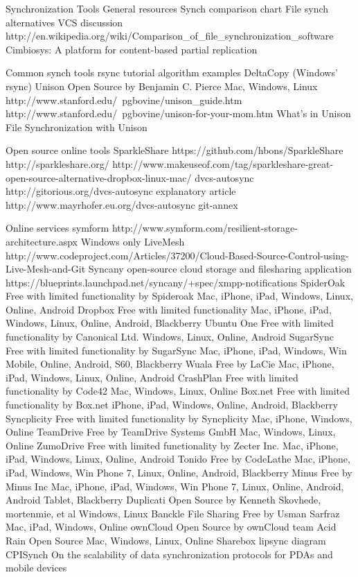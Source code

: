 	Synchronization Tools
		General resources
			Synch comparison chart 
			File synch alternatives 
			VCS discussion
			http://en.wikipedia.org/wiki/Comparison_of_file_synchronization_software
			Cimbiosys: A platform for content-based partial replication
		
		Common synch tools
			rsync
				tutorial
				algorithm 
				examples
			DeltaCopy (Windows' rsync)		
			Unison
				Open Source by Benjamin C. Pierce 
				Mac, Windows, Linux
				http://www.stanford.edu/~pgbovine/unison_guide.htm
				http://www.stanford.edu/~pgbovine/unison-for-your-mom.htm
				What’s in Unison
				File Synchronization with Unison
				
		Open source online tools
			SparkleShare 
				https://github.com/hbons/SparkleShare
				http://sparkleshare.org/
				http://www.makeuseof.com/tag/sparkleshare-great-open-source-alternative-dropbox-linux-mac/
			dvcs-autosync
				http://gitorious.org/dvcs-autosync
				explanatory article
				http://www.mayrhofer.eu.org/dvcs-autosync
			git-annex
		
		
		Online services
			symform
			http://www.symform.com/resilient-storage-architecture.aspx
				Windows only
			LiveMesh 
				http://www.codeproject.com/Articles/37200/Cloud-Based-Source-Control-using-Live-Mesh-and-Git
			Syncany
				open-source cloud storage and filesharing application
				https://blueprints.launchpad.net/syncany/+spec/xmpp-notifications 
			SpiderOak
				Free with limited functionality by Spideroak
				Mac, iPhone, iPad, Windows, Linux, Online, Android
			Dropbox
				Free with limited functionality 
				Mac, iPhone, iPad, Windows, Linux, Online, Android, Blackberry
			Ubuntu One
				Free with limited functionality by Canonical Ltd. 
				Windows, Linux, Online, Android
			SugarSync
				Free with limited functionality by SugarSync 
				Mac, iPhone, iPad, Windows, Win Mobile, Online, Android, S60, Blackberry
			Wuala
				Free by LaCie 
				Mac, iPhone, iPad, Windows, Linux, Online, Android
			CrashPlan
				Free with limited functionality by Code42 
				Mac, Windows, Linux, Online
			Box.net
				Free with limited functionality by Box.net
				iPhone, iPad, Windows, Online, Android, Blackberry
			Syncplicity
				Free with limited functionality by Syncplicity
				Mac, iPhone, Windows, Online
			TeamDrive
				Free by TeamDrive Systems GmbH 
				Mac, Windows, Linux, Online
			ZumoDrive
				Free with limited functionality by Zecter Inc.
				Mac, iPhone, iPad, Windows, Linux, Online, Android
			Tonido
				Free by CodeLathe 
				Mac, iPhone, iPad, Windows, Win Phone 7, Linux, Online, Android, Blackberry
			Minus
				Free by Minus Inc 
				Mac, iPhone, iPad, Windows, Win Phone 7, Linux, Online, Android, Android Tablet, Blackberry  
			Duplicati
				Open Source by Kenneth Skovhede, mortenmie, et al 
				Windows, Linux 
			 Banckle File Sharing
				Free by Usman Sarfraz 
				Mac, iPad, Windows, Online
			ownCloud
				Open Source by ownCloud team 
			Acid Rain
				Open Source
				Mac, Windows, Linux, Online 
			Sharebox
			lipsync
				diagram
			CPISynch 
				On the scalability of data synchronization protocols for PDAs and mobile devices
				
